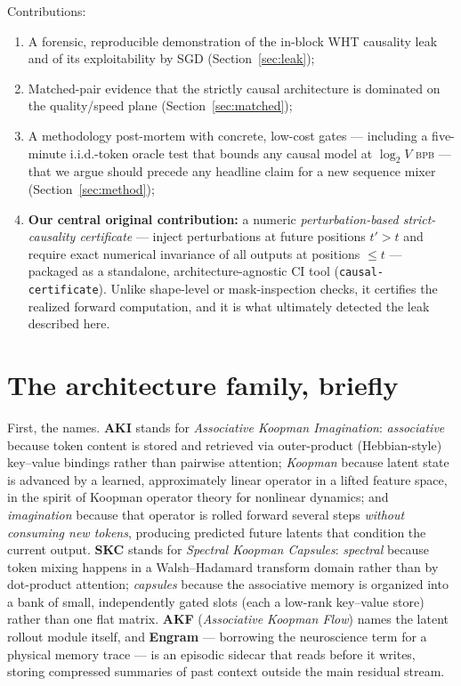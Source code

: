 \documentclass[11pt]{article}
\newcommand{\bpb}{\textsc{bpb}}
\begin{document}
Contributions:
\begin{enumerate}
  \item A forensic, reproducible demonstration of the in-block WHT causality
  leak and of its exploitability by SGD (Section~\ref{sec:leak});
  \item Matched-pair evidence that the strictly causal architecture is
  dominated on the quality/speed plane (Section~\ref{sec:matched});
  \item A methodology post-mortem with concrete, low-cost gates ---
  including a five-minute i.i.d.-token oracle test that bounds any causal
  model at $\log_2 V$ \bpb{} --- that we argue should precede any headline
  claim for a new sequence mixer (Section~\ref{sec:method});
  \item \textbf{Our central original contribution:} a numeric
  \emph{perturbation-based strict-causality certificate} --- inject
  perturbations at future positions $t' > t$ and require exact numerical
  invariance of all outputs at positions $\le t$ --- packaged as a
  standalone, architecture-agnostic CI tool
  (\texttt{causal-certificate}). Unlike shape-level or mask-inspection
  checks, it certifies the realized forward computation, and it is what
  ultimately detected the leak described here.
\end{enumerate}

\section{The architecture family, briefly}
\label{sec:arch}
First, the names. \textbf{AKI} stands for \emph{Associative Koopman
Imagination}: \emph{associative} because token content is stored and
retrieved via outer-product (Hebbian-style) key--value bindings rather than
pairwise attention; \emph{Koopman} because latent state is advanced by a
learned, approximately linear operator in a lifted feature space, in the
spirit of Koopman operator theory for nonlinear dynamics; and
\emph{imagination} because that operator is rolled forward several steps
\emph{without consuming new tokens}, producing predicted future latents that
condition the current output. \textbf{SKC} stands for \emph{Spectral Koopman
Capsules}: \emph{spectral} because token mixing happens in a Walsh--Hadamard
transform domain rather than by dot-product attention; \emph{capsules}
because the associative memory is organized into a bank of small,
independently gated slots (each a low-rank key--value store) rather than one
flat matrix. \textbf{AKF} (\emph{Associative Koopman Flow}) names the latent
rollout module itself, and \textbf{Engram} --- borrowing the neuroscience
term for a physical memory trace --- is an episodic sidecar that reads
before it writes, storing compressed summaries of past context outside the
main residual stream.
\end{document}
